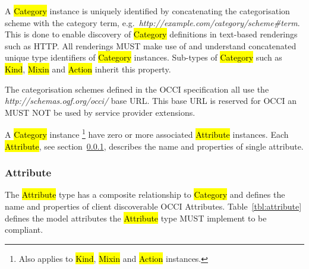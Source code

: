 \documentclass[10pt,a4paper]{article}
\begin{document}

A \hl{Category} instance is uniquely identified by concatenating the
categorisation scheme with the category term,
e.g.~\textit{http://example.com/category/scheme\#term}.  This is done
to enable discovery of \hl{Category} definitions in text-based
renderings such as HTTP. All renderings MUST make use of and
understand concatenated unique type identifiers of \hl{Category}
instances.
%
Sub-types of \hl{Category} such as \hl{Kind}, \hl{Mixin} and \hl{Action} inherit
this property.

The categorisation schemes defined in the OCCI specification all use
the \textit{http://schemas.ogf.org/occi/} base URL. This base URL is
reserved for OCCI an MUST NOT be used by service provider extensions.

A \hl{Category} instance%
\footnote{Also applies to \hl{Kind}, \hl{Mixin} and \hl{Action} instances.}
have zero or more associated \hl{Attribute} instances.
Each \hl{Attribute}, see section~\ref{sec:attribute},
describes the name and properties of single attribute.


\subsubsection{Attribute}
\label{sec:attribute}

The \hl{Attribute} type has a composite relationship to \hl{Category} and
defines the name and properties of client discoverable OCCI Attributes.
%
Table~\ref{tbl:attribute} defines the model attributes the \hl{Attribute} type
MUST implement to be compliant.
\end{document}
